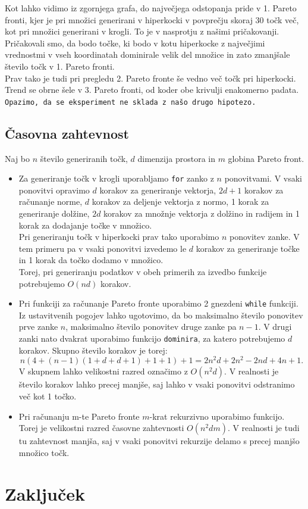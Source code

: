 \documentclass{article}
\begin{document}
Kot lahko vidimo iz zgornjega grafa, do največjega odstopanja pride v 1. Pareto fronti, kjer je pri množici generirani v hiperkocki v povprečju skoraj 30 točk več, kot pri množici generirani v krogli. To je v nasprotju z našimi pričakovanji. Pričakovali smo, da bodo točke, ki bodo v kotu hiperkocke z največjimi vrednostmi v vseh koordinatah dominirale velik del množice in zato zmanjšale število točk v 1. Pareto fronti. \\
Prav tako je tudi pri pregledu 2. Pareto fronte še vedno več točk pri hiperkocki. Trend se obrne šele v 3. Pareto fronti, od koder obe krivulji enakomerno padata.
\texttt{Opazimo, da se eksperiment ne sklada z našo drugo hipotezo.}

\subsection{Časovna zahtevnost}
Naj bo $n$ število generiranih točk, $d$ dimenzija prostora in $m$ globina Pareto front. 
\begin{itemize}
    \item Za generiranje točk v krogli uporabljamo \texttt{for} zanko z $n$ ponovitvami. V vsaki ponovitvi opravimo $d$ korakov za generiranje vektorja, $2d + 1$ korakov za računanje norme, $d$ korakov za deljenje vektorja z normo, 1 korak za generiranje dolžine, $2d$ korakov za množnje vektorja z dolžino in radijem in  1 korak za dodajanje točke v množico. \\
    Pri generiranju točk v hiperkocki prav tako uporabimo $n$ ponovitev zanke. V tem primeru pa v vsaki ponovitvi izvedemo le $d$ korakov za generiranje točke in 1 korak da točko dodamo v množico. \\
    Torej, pri generiranju podatkov v obeh primerih za izvedbo funkcije potrebujemo $O(nd)$ korakov. 
    \item Pri funkciji za računanje Pareto fronte uporabimo 2 gnezdeni \texttt{while} funkciji. Iz ustavitvenih pogojev lahko ugotovimo, da bo maksimalno število ponovitev prve zanke $n$, maksimalno število ponovitev druge zanke pa $n-1$. V drugi zanki nato dvakrat uporabimo funkcijo \texttt{dominira}, za katero potrebujemo $d$ korakov. Skupno število korakov je torej:
    $$
        n (4 + (n-1) (1 + d + d + 1) + 1 + 1) + 1 = 
        2n^2d + 2n^2 - 2nd + 4n + 1.
    $$
    V skupnem lahko velikostni razred označimo z $O(n^2d)$. V realnosti je število korakov lahko precej manjše, saj lahko v vsaki ponovitvi odstranimo več kot 1 točko.
    \item Pri računanju m-te Pareto fronte $m$-krat rekurzivno uporabimo funkcijo. Torej je velikostni razred časovne zahtevnosti $O(n^2dm)$. V realnosti je tudi tu zahtevnost manjša, saj v vsaki ponovitvi rekurzije delamo s precej manjšo množico točk.
\end{itemize}
 
\section{Zaključek}
\end{document}
